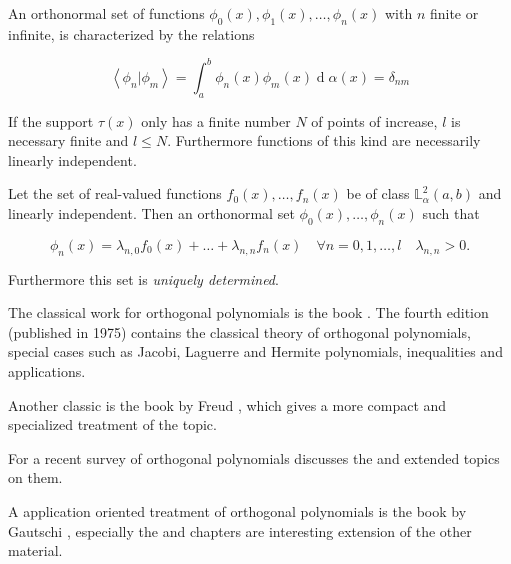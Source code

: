 \documentclass{article}
\DeclareMathOperator{\diff}{d}
\newcommand{\innerp}[2]{\left\langle #1 \vert #2 \right\rangle}
\begin{document}
\begin{definition}[label=18x0c7vo, name=Orthogonal Polynomials]
	An orthonormal set of functions \( \phi_0(x), \phi_1(x), \dots,
	\phi_n(x) \) with \( n \) finite or infinite, is characterized by the
	relations

	\[
		\innerp{\phi_n}{\phi_m} =
		\int_a^b\phi_n(x)\phi_m(x)\diff\alpha(x) = \delta_{nm}
	\]

	If the support \( \tau(x) \) only has a finite number \( N \) of points
	of increase, \( l \) is necessary finite and \( l \leq N \). Furthermore
	functions of this kind are necessarily linearly independent.

	\begin{theorem}[label=g__9ue2i, name=Reparametrization]
		Let the set of real-valued functions \( f_0(x), \dots, f_n(x) \)
		be of class \( \mathbb{L}_\alpha^2(a,b) \) and linearly
		independent. Then an orthonormal set \( \phi_0(x), \dots,
		\phi_n(x)\) such that 

		\[
			\phi_n(x) = \lambda_{n,0}f_0(x) + \dots +
			\lambda_{n,n}f_n(x)\quad\forall
			n=0,1,\dots,l\quad\lambda_{n,n} > 0.
		\]

		Furthermore this set is \emph{uniquely determined}.
	\end{theorem}

	\begin{literature}[label=ckyn0xr9, name=Classical]
		The classical work for orthogonal polynomials is the book
		\cite{szeg1939orthogonal}. The fourth edition (published in
		1975) contains the classical theory of orthogonal polynomials,
		special cases such as Jacobi, Laguerre and Hermite polynomials,
		inequalities and applications.

		Another classic is the book by Freud \cite{freud2014orthogonal},
		which gives a more compact and specialized treatment of the
		topic.

		For a recent survey of orthogonal polynomials
		\cite{totik2005orthogonal} discusses the \cite[origin][search=Some questions leading to]{totik2005orthogonal} and
		extended topics on them.

		A application oriented treatment of orthogonal polynomials is
		the book by Gautschi \cite{gautschi2004orthogonal}, especially
		the \cite[computational methods][search=2 Computational Methods]{gautschi2004orthogonal} and \cite[application][search=3 Applications]{gautschi2004orthogonal} 
		chapters are interesting extension of the other material.
	\end{literature}
	

\end{definition}
\end{document}
